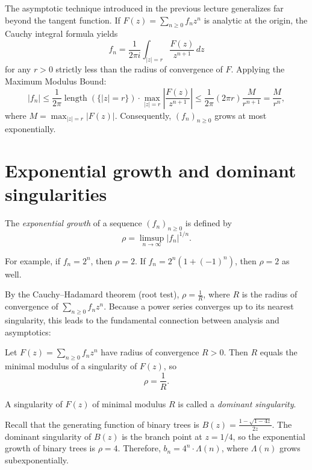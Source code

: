 
The asymptotic technique introduced in the previous lecture generalizes far beyond the tangent function.
If \(F(z) = \sum_{n \ge 0} f_n z^n\) is analytic at the origin, the Cauchy integral formula yields
\[
    f_n = \frac{1}{2\pi i} \int_{|z| = r} \frac{F(z)}{z^{n+1}} \, dz
\]
for any \(r > 0\) strictly less than the radius of convergence of \(F\).
Applying the Maximum Modulus Bound:
\[
    |f_n| \le \frac{1}{2\pi} \operatorname{length}(\{|z| = r\}) \cdot \max_{|z| = r} \left| \frac{F(z)}{z^{n+1}} \right|
    \le \frac{1}{2\pi} (2\pi r) \frac{M}{r^{n+1}} = \frac{M}{r^n},
\]
where \(M = \max_{|z| = r} |F(z)|\).
Consequently, \((f_n)_{n \ge 0}\) grows at most exponentially.

\section*{Exponential growth and dominant singularities}

\begin{definition}
    The \emph{exponential growth} of a sequence \((f_n)_{n \ge 0}\) is defined by
    \[
        \rho = \limsup_{n \to \infty} |f_n|^{1/n}.
    \]
\end{definition}

For example, if \(f_n = 2^n\), then \(\rho = 2\).
If \(f_n = 2^n(1 + (-1)^n)\), then \(\rho = 2\) as well.

By the Cauchy--Hadamard theorem (root test), \(\rho = \frac{1}{R}\), where \(R\) is the radius of convergence of \(\sum_{n \ge 0} f_n z^n\).
Because a power series converges up to its nearest singularity, this leads to the fundamental connection between analysis and asymptotics:

\begin{theorem}
    Let \(F(z) = \sum_{n \ge 0} f_n z^n\) have radius of convergence \(R > 0\).
    Then \(R\) equals the minimal modulus of a singularity of \(F(z)\), so
    \[
        \rho = \frac{1}{R}.
    \]
\end{theorem}

\begin{definition}
    A singularity of \(F(z)\) of minimal modulus \(R\) is called a \emph{dominant singularity}.
\end{definition}

\begin{example}
    Recall that the generating function of binary trees is \(B(z) = \frac{1 - \sqrt{1 - 4z}}{2z}\).
    The dominant singularity of \(B(z)\) is the branch point at \(z = 1/4\), so the exponential growth of binary trees is \(\rho = 4\).
    Therefore, \(b_n = 4^n \cdot \Lambda(n)\), where \(\Lambda(n)\) grows subexponentially.
\end{example}


